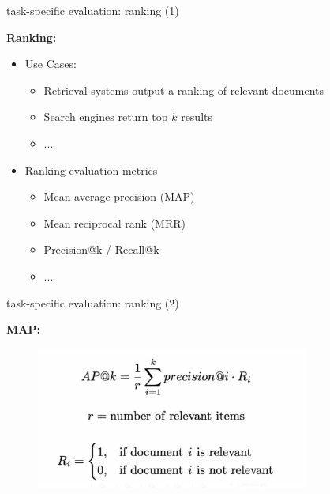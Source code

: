 \begin{vbframe}{task-specific evaluation: ranking (1)}

\vfill

\textbf{Ranking:}

\begin{itemize}
		\item Use Cases:
				\begin{itemize}
					\item Retrieval systems output a ranking of relevant documents
					\item Search engines return top $k$ results
					\item ...
				\end{itemize}
		\item Ranking evaluation metrics
				\begin{itemize}
					\item Mean average precision (MAP)
					\item Mean reciprocal rank (MRR)
					\item Precision@k / Recall@k
					\item ...
				\end{itemize}
\end{itemize}
\vfill

\end{vbframe}


\begin{vbframe}{task-specific evaluation: ranking (2)}

\vfill

\textbf{MAP:}

\begin{figure}
    \centering
    \includegraphics[width=9cm]{figure/42-ap.png}
\end{figure}

\vfill

\end{vbframe}

